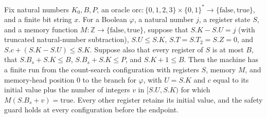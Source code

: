 \begin{theorem}
\label{Complexity.LogProg.ExpBFS.count_run}
\leanok
{}
Fix natural numbers $K_0,B,P$, an oracle
$\mathrm{orc}:\{0,1,2,3\}\times\{0,1\}^*\to\{\mathrm{false},\mathrm{true}\}$, and a
finite bit string $x$. For a Boolean $\varphi$, a natural number $j$, a register state
$S$, and a memory function $M:\mathbb Z\to\{\mathrm{false},\mathrm{true}\}$, suppose
that $S.K-S.U=j$ (with truncated natural-number subtraction), $S.U\le S.K$,
$S.T=S.T_2=S.Z=0$, and $S.c+(S.K-S.U)\le S.K$. Suppose also that every register of $S$
is at most $B$, that $S.B_s+S.K\le B$, $S.B_s+S.K\le P$, and $S.K+1\le B$. Then the
machine has a finite run from the count-search configuration with registers $S$, memory
$M$, and memory-head position $0$ to the branch for $\varphi$, with $U=S.K$ and $c$
equal to its initial value plus the number of integers $v$ in $[S.U,S.K)$ for which
$M(S.B_s+v)=\mathrm{true}$. Every other register retains its initial value, and the
safety guard holds at every configuration before the endpoint.
\end{theorem}

